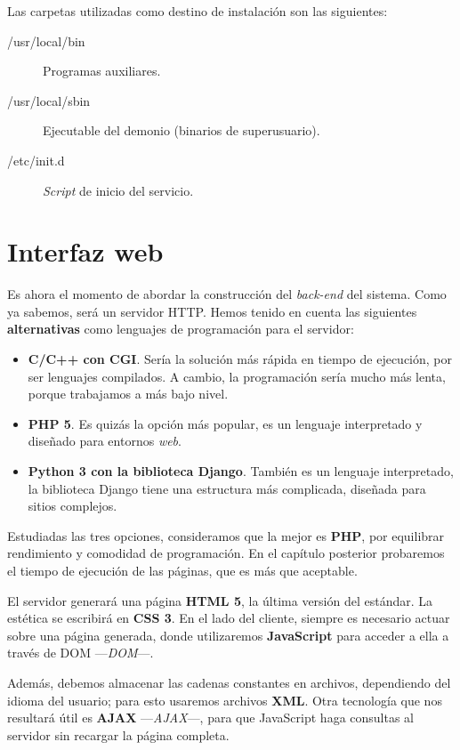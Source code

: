 Las carpetas utilizadas como destino de instalación son las siguientes:

\begin{description}
	\item[/usr/local/bin] Programas auxiliares.
	\item[/usr/local/sbin] Ejecutable del demonio (binarios de superusuario).
	\item[/etc/init.d] \textit{Script} de inicio del servicio.
\end{description}

\section{Interfaz web}

Es ahora el momento de abordar la construcción del \textit{back-end} del sistema. Como ya sabemos, será un servidor \acrshort{HTTP}. Hemos tenido en cuenta las siguientes \textbf{alternativas} como lenguajes de programación para el servidor:

\begin{itemize}
	\item \textbf{C/C++ con \acrshort{CGI}}. Sería la solución más rápida en tiempo de ejecución, por ser lenguajes compilados. A cambio, la programación sería mucho más lenta, porque trabajamos a más bajo nivel.
	
	\item \textbf{PHP 5}. Es quizás la opción más popular, es un lenguaje interpretado y diseñado para entornos \textit{web}.
	
	\item \textbf{Python 3 con la biblioteca Django}. También es un lenguaje interpretado, la biblioteca Django tiene una estructura más complicada, diseñada para sitios complejos.
\end{itemize}

Estudiadas las tres opciones, consideramos que la mejor es \textbf{PHP}, por equilibrar rendimiento y comodidad de programación. En el capítulo posterior probaremos el tiempo de ejecución de las páginas, que es más que aceptable.

El servidor generará una página \textbf{\acrshort{HTML} 5}, la última versión del estándar. La estética se escribirá en \textbf{\acrshort{CSS} 3}. En el lado del cliente, siempre es necesario actuar sobre una página generada, donde utilizaremos \textbf{JavaScript} para acceder a ella a través de \acrshort{DOM} ---\textit{\acrlong{DOM}}---.

Además, debemos almacenar las cadenas constantes en archivos, dependiendo del idioma del usuario; para esto usaremos archivos \textbf{\acrshort{XML}}. Otra tecnología que nos resultará útil es \textbf{\acrshort{AJAX}} ---\textit{\acrlong{AJAX}}---, para que JavaScript haga consultas al servidor sin recargar la página completa.

